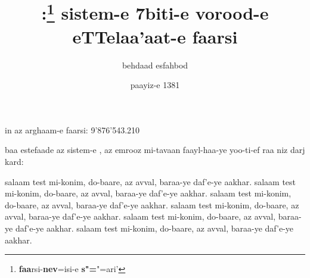\documentclass[a4paper]{article}
\title{\faanoos:\footnote{\textbf{faa}rsi-\textbf{nev}=isi-e \textbf{s"=}"=ari'}
sistem-e 7biti-e vorood-e eTTelaa'aat-e faarsi
}
\author{behdaad esfahbod}
\date{paayiz-e 1381}
\begin{document}
\maketitle

in az arghaam-e faarsi: 9'876'543.210

baa estefaade az sistem-e \faanoos, az emrooz mi-tavaan faayl-haa-ye
yoo-ti-ef raa niz darj kard:

\noindent
salaam test mi-konim, do-baare, az avval, baraa-ye daf'e-ye aakhar.
salaam test mi-konim, do-baare, az avval, baraa-ye daf'e-ye aakhar.
salaam test mi-konim, do-baare, az avval, baraa-ye daf'e-ye aakhar.
salaam test mi-konim, do-baare, az avval, baraa-ye daf'e-ye aakhar.
salaam test mi-konim, do-baare, az avval, baraa-ye daf'e-ye aakhar.
salaam test mi-konim, do-baare, az avval, baraa-ye daf'e-ye aakhar.

\begin{center}

\end{center}

\begin{quotation}
\noindent

\end{quotation}
\end{document}
